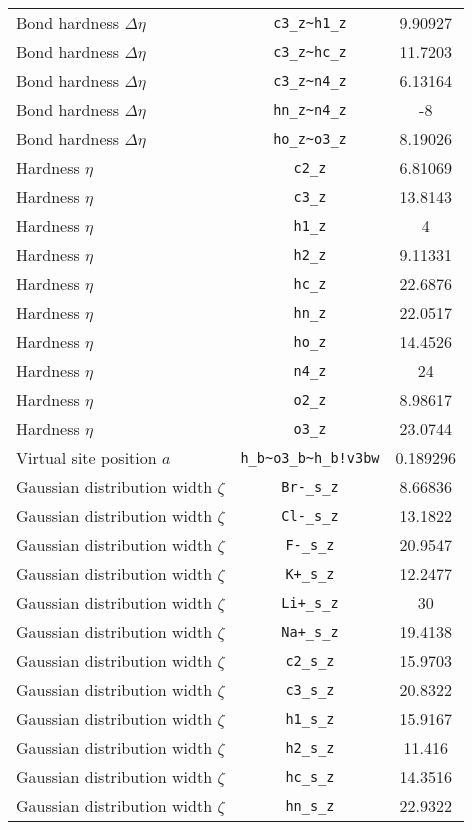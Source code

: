 \begin{table}[ht]
\begin{tabular}{lcc}
Bond hardness $\Delta\eta$ & \verb^c3_z~h1_z^ & 9.90927 \\ 
Bond hardness $\Delta\eta$ & \verb^c3_z~hc_z^ & 11.7203 \\ 
Bond hardness $\Delta\eta$ & \verb^c3_z~n4_z^ & 6.13164 \\ 
Bond hardness $\Delta\eta$ & \verb^hn_z~n4_z^ & -8 \\ 
Bond hardness $\Delta\eta$ & \verb^ho_z~o3_z^ & 8.19026 \\ 
Hardness $\eta$ & \verb^c2_z^ & 6.81069 \\ 
Hardness $\eta$ & \verb^c3_z^ & 13.8143 \\ 
Hardness $\eta$ & \verb^h1_z^ & 4 \\ 
Hardness $\eta$ & \verb^h2_z^ & 9.11331 \\ 
Hardness $\eta$ & \verb^hc_z^ & 22.6876 \\ 
Hardness $\eta$ & \verb^hn_z^ & 22.0517 \\ 
Hardness $\eta$ & \verb^ho_z^ & 14.4526 \\ 
Hardness $\eta$ & \verb^n4_z^ & 24 \\ 
Hardness $\eta$ & \verb^o2_z^ & 8.98617 \\ 
Hardness $\eta$ & \verb^o3_z^ & 23.0744 \\ 
Virtual site position $a$ & \verb^h_b~o3_b~h_b!v3bw^ & 0.189296 \\ 
Gaussian distribution width $\zeta$ & \verb^Br-_s_z^ & 8.66836 \\ 
Gaussian distribution width $\zeta$ & \verb^Cl-_s_z^ & 13.1822 \\ 
Gaussian distribution width $\zeta$ & \verb^F-_s_z^ & 20.9547 \\ 
Gaussian distribution width $\zeta$ & \verb^K+_s_z^ & 12.2477 \\ 
Gaussian distribution width $\zeta$ & \verb^Li+_s_z^ & 30 \\ 
Gaussian distribution width $\zeta$ & \verb^Na+_s_z^ & 19.4138 \\ 
Gaussian distribution width $\zeta$ & \verb^c2_s_z^ & 15.9703 \\ 
Gaussian distribution width $\zeta$ & \verb^c3_s_z^ & 20.8322 \\ 
Gaussian distribution width $\zeta$ & \verb^h1_s_z^ & 15.9167 \\ 
Gaussian distribution width $\zeta$ & \verb^h2_s_z^ & 11.416 \\ 
Gaussian distribution width $\zeta$ & \verb^hc_s_z^ & 14.3516 \\ 
Gaussian distribution width $\zeta$ & \verb^hn_s_z^ & 22.9322 \\ 

\end{tabular}
\end{table}
